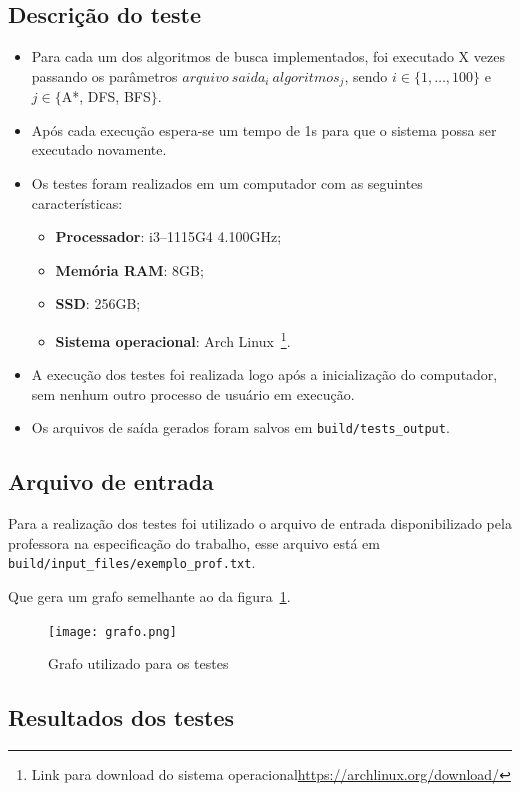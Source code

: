 \documentclass[12pt, a4paper]{article}
\begin{document}
\subsection{Descrição do teste}
\begin{itemize}
    \item Para cada um dos algoritmos de busca implementados,
    foi executado X vezes passando os parâmetros \( arquivo ~ saida_i ~ algoritmos_j \),
    sendo \( i \in \{1, \ldots, 100\} \) e \( j \in \{ \)A*, DFS, BFS\( \} \).
    \item Após cada execução espera-se um tempo de 1s para que o sistema possa ser executado novamente.
    \item Os testes foram realizados em um computador com as seguintes características:
    \begin{itemize}
        \item\textbf{Processador}: i3--1115G4 4.100GHz;
        \item\textbf{Memória RAM}: 8GB\@;
        \item\textbf{SSD}: 256GB\@;
        \item\textbf{Sistema operacional}: Arch Linux~\footnote{Link para download do sistema operacional\url{https://archlinux.org/download/}}.
    \end{itemize}
    \item A execução dos testes foi realizada logo após a inicialização do computador, sem nenhum outro processo de usuário em execução.
    \item Os arquivos de saída gerados foram salvos em \texttt{build/tests\_output}.
\end{itemize}

\subsection{Arquivo de entrada}\label{sec:arquivo_ent}
Para a realização dos testes foi utilizado o arquivo de entrada disponibilizado pela professora na especificação do trabalho,
esse arquivo está em \texttt{build/input\_files/exemplo\_prof.txt}.

Que gera um grafo semelhante ao da figura~\ref{fig:grafo}.
\begin{figure}[!h]
    \centering
    \texttt{[image: grafo.png]}
    \caption{Grafo utilizado para os testes}
    \label{fig:grafo}
\end{figure}

\subsection{Resultados dos testes}\label{sec:res}
\end{document}

